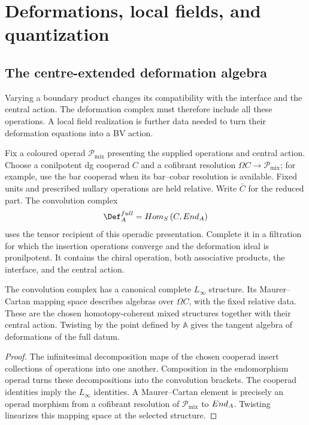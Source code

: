 \chapter{Deformations, local fields, and quantization}

\section{The centre-extended deformation algebra}
Varying a boundary product changes its compatibility with the interface and the central action. The deformation complex must therefore include all these operations. A local field realization is further data needed to turn their deformation equations into a BV action.

Fix a coloured operad $\mathcal P_{\mathrm{mix}}$ presenting the supplied
operations and central action. Choose a conilpotent dg cooperad $C$ and
a cofibrant resolution $\Omega C\to\mathcal P_{\mathrm{mix}}$; for example,
use the bar cooperad when its bar--cobar resolution is available. Fixed units
and prescribed nullary operations are held relative. Write $\bar C$ for
the reduced part. The convolution complex
\[
 \Def_{\mathbb A}^{\mathrm{full}}
 =\Hom_{\mathbb S}
 \left(\bar C,\End_{\mathbb A}\right)
\]
uses the tensor recipient of this operadic presentation. Complete it in a
filtration for which the insertion operations converge and the deformation
ideal is pronilpotent. It contains the chiral operation, both associative
products, the interface, and the central action.

\begin{theorem}
The convolution complex has a canonical complete $L_\infty$ structure.  Its Maurer--Cartan mapping space describes algebras over $\Omega C$,
with the fixed relative data. These are the chosen homotopy-coherent mixed
structures together with their central action.  Twisting by the point defined by $\mathbb A$ gives the tangent algebra of deformations of the full datum.
\end{theorem}
\begin{proof}
The infinitesimal decomposition maps of the chosen cooperad insert collections of operations into one another.  Composition in the endomorphism operad turns these decompositions into the convolution brackets.  The cooperad identities imply the $L_\infty$ identities.  A Maurer--Cartan element is precisely an operad morphism from a cofibrant resolution of $\mathcal P_{\mathrm{mix}}$ to $End_{A}$.  Twisting linearizes this mapping space at the selected structure.
\end{proof}

